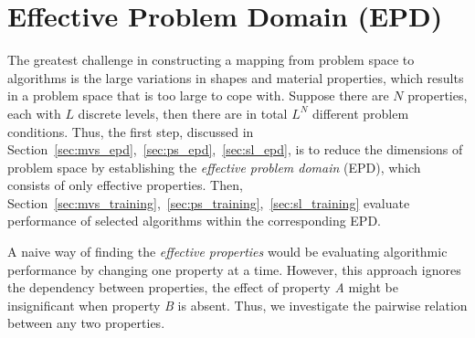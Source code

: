 

\section{Effective Problem Domain (EPD)}
The greatest challenge in constructing a mapping from problem space to algorithms is the large variations in shapes and material properties, which results in a problem space that is too large to cope with. Suppose there are $N$ properties, each with $L$ discrete levels, then there are in total $L^N$ different problem conditions. Thus, the first step, discussed in Section~\ref{sec:mvs_epd},~\ref{sec:ps_epd},~\ref{sec:sl_epd}, is to reduce the dimensions of problem space by establishing the \textit{effective problem domain} (EPD), which consists of only effective properties. Then, Section~\ref{sec:mvs_training},~\ref{sec:ps_training},~\ref{sec:sl_training} evaluate performance of selected algorithms within the corresponding EPD.

A naive way of finding the \textit{effective properties} would be evaluating algorithmic performance by changing one property at a time. However, this approach ignores the dependency between properties, \ie the effect of property \textit{A} might be insignificant when property \textit{B} is absent. Thus, we investigate the pairwise relation between any two properties.

